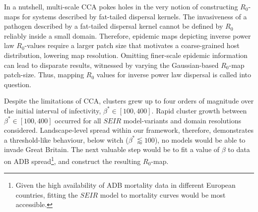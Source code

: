 In a nutshell, multi-scale CCA pokes holes in the very notion of constructing $R_0$-maps for systems described by fat-tailed dispersal kernels.
The invasiveness of a pathogen described by a fat-tailed dispersal kernel cannot be defined by $R_0$ reliably inside a small domain.
Therefore, epidemic maps depicting inverse power law $R_0$-values require a larger patch size that motivates a coarse-grained host distribution, lowering map resolution.
Omitting finer-scale epidemic information can lead to disparate results, witnessed by varying the Gaussian-based $R_0$-map patch-size.
Thus, mapping $R_0$ values for inverse power law dispersal is called into question.

Despite the limitations of CCA, clusters grew up to four orders of magnitude over the initial interval of infectivity, $\beta^*\in [100, 400]$.
Rapid cluster growth between $\beta^*\in [100, 400]$ occurred for all $SEIR$ model-variants and domain resolutions considered.
Landscape-level spread within our framework, therefore, demonstrates a threshold-like behaviour, below witch ($\beta^* \lessapprox 100$), no models would be able to invade Great Britain.
The next valuable step would be to fit a value of $\beta$ to data on ADB spread\footnote{Given the high availability of ADB mortality data in different European countries, fitting the $SEIR$ model to mortality curves would be most accessible.}, 
and construct the resulting $R_0$-map.




